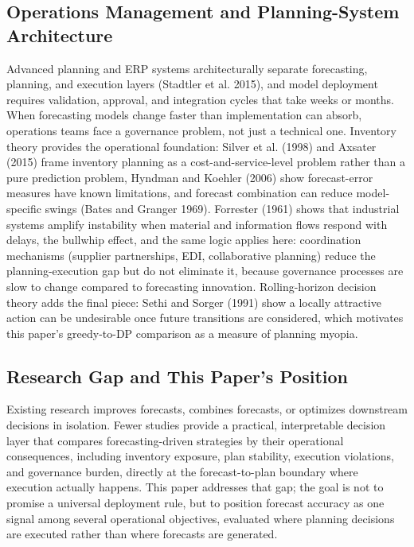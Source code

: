 \subsection{Operations Management and Planning-System Architecture}

Advanced planning and ERP systems architecturally separate forecasting, planning, and execution layers (Stadtler et al. 2015), and model deployment requires validation, approval, and integration cycles that take weeks or months. When forecasting models change faster than implementation can absorb, operations teams face a governance problem, not just a technical one. Inventory theory provides the operational foundation: Silver et al. (1998) and Axsater (2015) frame inventory planning as a cost-and-service-level problem rather than a pure prediction problem, Hyndman and Koehler (2006) show forecast-error measures have known limitations, and forecast combination can reduce model-specific swings (Bates and Granger 1969). Forrester (1961) shows that industrial systems amplify instability when material and information flows respond with delays, the bullwhip effect, and the same logic applies here: coordination mechanisms (supplier partnerships, EDI, collaborative planning) reduce the planning-execution gap but do not eliminate it, because governance processes are slow to change compared to forecasting innovation. Rolling-horizon decision theory adds the final piece: Sethi and Sorger (1991) show a locally attractive action can be undesirable once future transitions are considered, which motivates this paper's greedy-to-DP comparison as a measure of planning myopia.

\subsection{Research Gap and This Paper's Position}

Existing research improves forecasts, combines forecasts, or optimizes downstream decisions in isolation. Fewer studies provide a practical, interpretable decision layer that compares forecasting-driven strategies by their operational consequences, including inventory exposure, plan stability, execution violations, and governance burden, directly at the forecast-to-plan boundary where execution actually happens. This paper addresses that gap; the goal is not to promise a universal deployment rule, but to position forecast accuracy as one signal among several operational objectives, evaluated where planning decisions are executed rather than where forecasts are generated.
